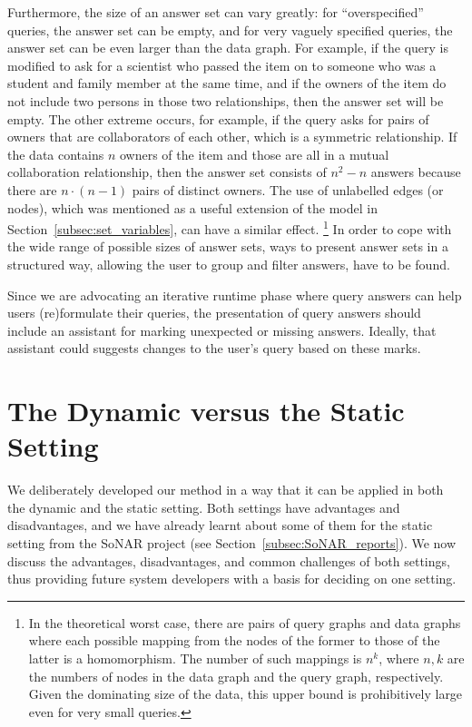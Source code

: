 Furthermore, the size of an answer set can vary greatly: for \enquote{overspecified} queries, the answer set can be empty,
and for very vaguely specified queries, the answer set can be even larger than the data graph.
For example, if the query  is modified to ask for a scientist who passed the item on
to someone who was a student and family member at the same time, and if the owners of the item
do not include two persons in those two relationships, then the answer set will be empty.
The other extreme occurs, for example, if the query asks for pairs of owners that are collaborators of each other,
which is a symmetric relationship. If the data contains $n$ owners of the item and those are all in a mutual collaboration relationship,
then the answer set consists of $n^2 - n$ answers because there are $n \cdot (n-1)$ pairs of distinct owners.
The use of unlabelled edges (or nodes), which was mentioned as a useful extension of the model in Section~\ref{subsec:set_variables},
can have a similar effect.%
\footnote{%
  In the theoretical worst case, there are pairs of query graphs and data graphs
  where each possible mapping from the nodes of the former
  to those of the latter is a homomorphism. The number of such mappings is $n^k$,
  where $n,k$ are the numbers of nodes in the data graph and the query graph, respectively.
  Given the dominating size of the data, this upper bound is prohibitively large even for very small queries.%
}
In order to cope with the wide range of possible sizes of answer sets,
ways to present answer sets in a structured way,
allowing the user to group and filter answers, have to be found.

Since we are advocating an iterative runtime phase where query answers can help users (re)for\-mu\-late their queries,
the presentation of query answers should include an assistant for marking unexpected or missing answers.
Ideally, that assistant could suggests changes to the user's query based on these marks.

\section{The Dynamic versus the Static Setting}
\label{sec:dynamic_vs_static}

We deliberately developed our method in a way that it can be applied
in both the dynamic and the static setting.
Both settings have advantages and disadvantages,
and we have already learnt about some of them for the static setting
from the SoNAR project (see Section~\ref{subsec:SoNAR_reports}).
We now discuss the advantages, disadvantages, and common challenges of both settings,
thus providing future system developers with a basis for deciding on one setting.

